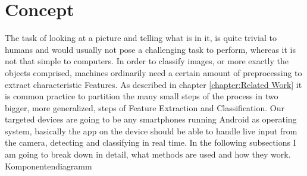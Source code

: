 \chapter{Concept}\label{chapter:Concept}

The task of looking at a picture and telling what is in it, is quite trivial to humans and would usually not pose a challenging task to perform, whereas it is not that simple to computers. In order to classify images, or more exactly the objects comprised, machines ordinarily need a certain amount of preprocessing to extract characteristic Features. As described in chapter \ref{chapter:Related Work} it is common practice to partition the many small steps of the process in two bigger, more generalized, steps of Feature Extraction and Classification. Our targeted devices are going to be any smartphones running Android as operating system, basically the app on the device should be able to handle live input from the camera, detecting and classifying in real time. In the following subsections I am going to break down in detail, what  methods are used and how they work. \newline\newline\newline
Komponentendiagramm\newline


